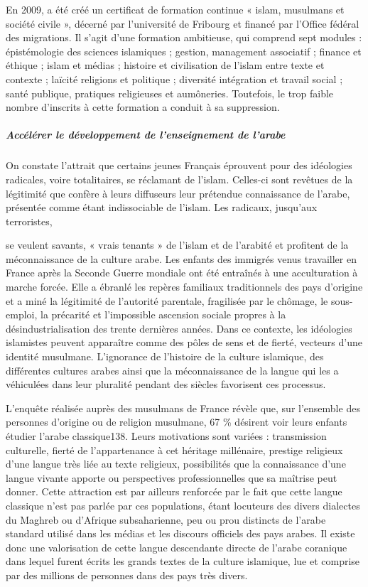 En 2009, a été créé un certificat de formation continue « islam,
musulmans et société civile », décerné par l'université de Fribourg et
financé par l'Office fédéral des migrations. Il s'agit d'une formation
ambitieuse, qui comprend sept modules : épistémologie des sciences
islamiques ; gestion, management associatif ; finance et éthique ; islam
et médias ; histoire et civilisation de l'islam entre texte et contexte
; laïcité religions et politique ; diversité intégration et travail
social ; santé publique, pratiques religieuses et aumôneries. Toutefois,
le trop faible nombre d'inscrits à cette formation a conduit à sa
suppression.


\hypertarget{accuxe9luxe9rer-le-duxe9veloppement-de-lenseignement-de-larabe}{%
\subparagraph{Accélérer le développement de l'enseignement de
l'arabe}\label{accuxe9luxe9rer-le-duxe9veloppement-de-lenseignement-de-larabe}}


On constate l'attrait que certains jeunes Français éprouvent pour des
idéologies radicales, voire totalitaires, se réclamant de l'islam.
Celles-ci sont revêtues de la légitimité que confère à leurs diffuseurs
leur prétendue connaissance de l'arabe, présentée comme étant
indissociable de l'islam. Les radicaux, jusqu'aux terroristes,



se veulent savants, « vrais tenants » de l'islam et de l'arabité et
profitent de la méconnaissance de la culture arabe. Les enfants des
immigrés venus travailler en France après la Seconde Guerre mondiale ont
été entraînés à une acculturation à marche forcée. Elle a ébranlé les
repères familiaux traditionnels des pays d'origine et a miné la
légitimité de l'autorité parentale, fragilisée par le chômage, le sous-
emploi, la précarité et l'impossible ascension sociale propres à la
désindustrialisation des trente dernières années. Dans ce contexte, les
idéologies islamistes peuvent apparaître comme des pôles de sens et de
fierté, vecteurs d'une identité musulmane. L'ignorance de l'histoire de
la culture islamique, des différentes cultures arabes ainsi que la
méconnaissance de la langue qui les a véhiculées dans leur pluralité
pendant des siècles favorisent ces processus.

L'enquête réalisée auprès des musulmans de France révèle que, sur
l'ensemble des personnes d'origine ou de religion musulmane, 67 \%
désirent voir leurs enfants étudier l'arabe classique138. Leurs
motivations sont variées : transmission culturelle, fierté de
l'appartenance à cet héritage millénaire, prestige religieux d'une
langue très liée au texte religieux, possibilités que la connaissance
d'une langue vivante apporte ou perspectives professionnelles que sa
maîtrise peut donner. Cette attraction est par ailleurs renforcée par le
fait que cette langue classique n'est pas parlée par ces populations,
étant locuteurs des divers dialectes du Maghreb ou d'Afrique
subsaharienne, peu ou prou distincts de l'arabe standard utilisé dans
les médias et les discours officiels des pays arabes. Il existe donc une
valorisation de cette langue descendante directe de l'arabe coranique
dans lequel furent écrits les grands textes de la culture islamique, lue
et comprise par des millions de personnes dans des pays très divers.


